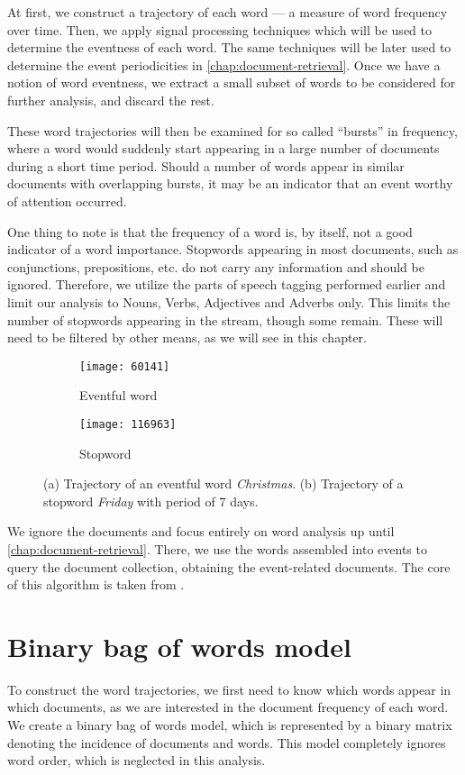 At first, we construct a trajectory of each word --- a measure of word frequency over time. Then, we apply signal processing techniques which will be used to determine the eventness of each word. The same techniques will be later used to determine the event periodicities in \autoref{chap:document-retrieval}. Once we have a notion of word eventness, we extract a small subset of words to be considered for further analysis, and discard the rest.

These word trajectories will then be examined for so called ``bursts'' in frequency, where a word would suddenly start appearing in a large number of documents during a short time period. Should a number of words appear in similar documents with overlapping bursts, it may be an indicator that an event worthy of attention occurred.

One thing to note is that the frequency of a word is, by itself, not a good indicator of a word importance.
Stopwords appearing in most documents, such as conjunctions, prepositions, etc. do not carry any information and should be ignored. Therefore, we utilize the parts of speech tagging performed earlier and limit our analysis to Nouns, Verbs, Adjectives and Adverbs only. This limits the number of stopwords appearing in the stream, though some remain. These will need to be filtered by other means, as we will see in this chapter.

\begin{figure}
\centering
\begin{subfigure}{.5\textwidth}
  \centering
  \texttt{[image: 60141]}  %
  \caption{Eventful word}
  \label{fig:vanoce}
\end{subfigure}%
\begin{subfigure}{.5\textwidth}
  \centering
  \texttt{[image: 116963]}  %
  \caption{Stopword}
  \label{fig:patek}
\end{subfigure}
\caption{(a) Trajectory of an eventful word \textit{Christmas}. (b) Trajectory of a stopword \textit{Friday} with period of 7 days.}
\end{figure}

We ignore the documents and focus entirely on word analysis up until \autoref{chap:document-retrieval}. There, we use the words assembled into events to query the document collection, obtaining the event-related documents. The core of this algorithm is taken from \cite{event-detection}.


\section{Binary bag of words model}
To construct the word trajectories, we first need to know which words appear in which documents, as we are interested in the document frequency of each word. We create a binary bag of words model, which is represented by a binary matrix denoting the incidence of documents and words. This model completely ignores word order, which is neglected in this analysis.

